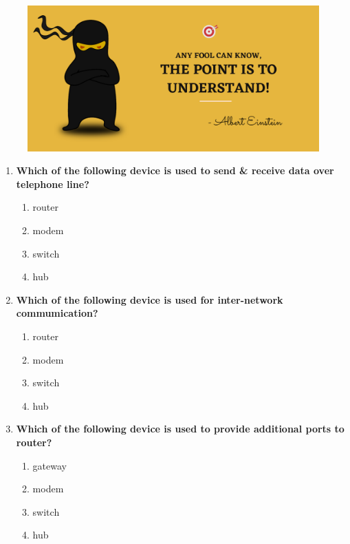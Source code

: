 \setlength{\columnsep}{3pt}
\begin{flushleft}
	
	\paragraph{}
	\bigskip
	
	\begin{figure}[h!]
		\centering
		\includegraphics[scale=.2]{content/practise.jpg}
	\end{figure}	
	\begin{enumerate}
		
		\item \textbf{Which of the following device is used to send \& receive data over telephone line?}
		\begin{enumerate}[label=(\alph*)]
			\item router
			\item modem %
			\item switch
			\item hub
		\end{enumerate}
		\bigskip
		\bigskip
		
		\item \textbf{Which of the following device is used for inter-network commumication?}
		\begin{enumerate}[label=(\alph*)]
			\item router %
			\item modem 
			\item switch
			\item hub
		\end{enumerate}
		\bigskip
		\bigskip	
		
		\item \textbf{Which of the following device is used to provide additional ports to router?}
		\begin{enumerate}[label=(\alph*)]
			\item gateway
			\item modem 
			\item switch   %
			\item hub
		\end{enumerate}
		\bigskip
		\bigskip	


\end{enumerate}
\end{flushleft}

